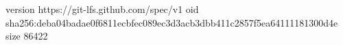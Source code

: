 version https://git-lfs.github.com/spec/v1
oid sha256:deba04badae0f6811ecbfec089ec3d3acb3dbb411c2857f5ea64111181300d4e
size 86422
